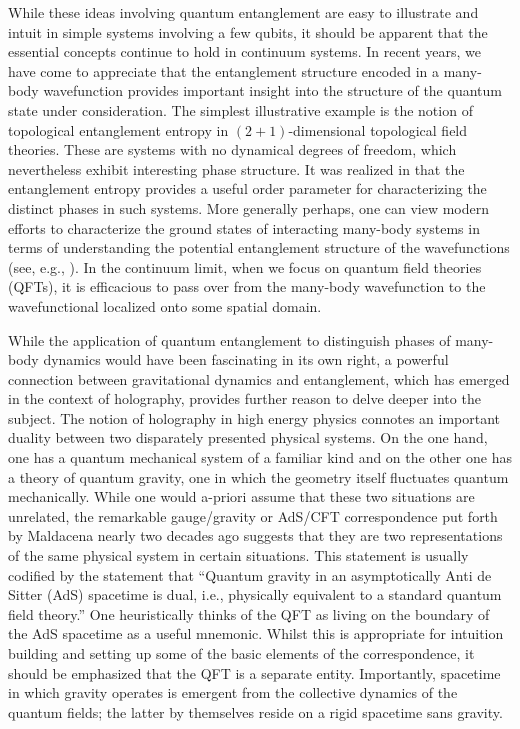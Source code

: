 \documentclass[12pt,openany]{book}
\begin{document}
While these ideas involving quantum entanglement are easy to illustrate and intuit in simple systems involving a few qubits, it should be apparent that the essential concepts continue to hold in continuum systems. In recent years, we have come to appreciate that the entanglement structure encoded in a many-body wavefunction provides important insight into the structure of the quantum state under consideration. The simplest illustrative example is the notion of topological entanglement entropy in $(2+1)$-dimensional topological field theories. These are systems with no dynamical degrees of freedom, which nevertheless exhibit interesting phase structure. It was realized in \cite{Kitaev:2005dm,Levin:2006aa} that the entanglement entropy provides a useful order parameter for characterizing the distinct phases in such systems. More generally perhaps, one can view modern efforts to characterize the ground states of interacting many-body systems in terms of understanding the potential entanglement structure of the wavefunctions (see, e.g., \cite{Vishwanath:2014aa}). In the continuum limit, when we focus on quantum field theories (QFTs), it is efficacious to pass over from the many-body wavefunction to the wavefunctional localized onto some spatial domain.

While the application of  quantum entanglement to distinguish phases of many-body dynamics would have been fascinating in its own right, a powerful connection between gravitational dynamics and entanglement, which has emerged in the context of holography, provides further reason to delve deeper into the subject. The notion of holography in high energy physics connotes an important duality between two disparately presented physical systems. On the one hand, one has a quantum mechanical system of a familiar kind and on the other one has a theory of quantum gravity, one in which the geometry itself fluctuates quantum mechanically. While one would a-priori assume that these two situations are unrelated, the remarkable gauge/gravity or AdS/CFT correspondence put forth by Maldacena nearly two decades ago \cite{Maldacena:1997re} suggests that they are two representations of the same physical system in certain situations. This statement is usually codified by the statement that ``Quantum gravity in an asymptotically Anti de Sitter (AdS) spacetime is dual, i.e., physically equivalent to a standard quantum field theory.'' One heuristically thinks of the QFT as living on the boundary of the AdS spacetime as a useful mnemonic. Whilst this is appropriate for intuition building and setting up some of the basic elements of the correspondence, it should be emphasized that the QFT is a separate entity. Importantly, spacetime in which gravity operates is emergent from the collective dynamics of the quantum fields;  the latter by themselves reside on a rigid spacetime sans gravity.
\end{document}
